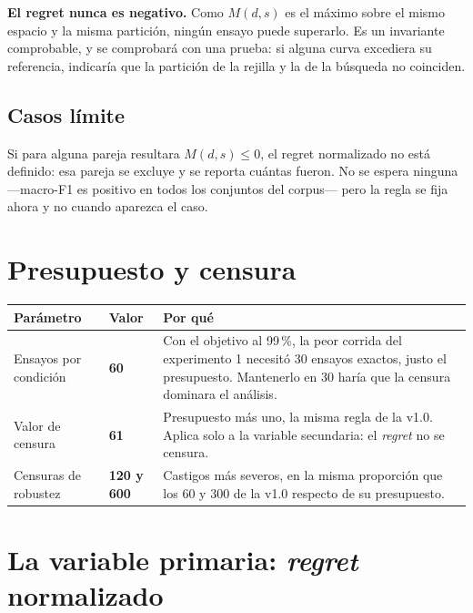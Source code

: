 \documentclass[11pt,letterpaper]{article}
\begin{document}
\textbf{El regret nunca es negativo.} Como $M(d,s)$ es el máximo sobre el mismo
espacio y la misma partición, ningún ensayo puede superarlo. Es un invariante
comprobable, y se comprobará con una prueba: si alguna curva excediera su referencia,
indicaría que la partición de la rejilla y la de la búsqueda no coinciden.

\subsection{Casos límite}

Si para alguna pareja resultara $M(d,s) \leq 0$, el regret normalizado no está
definido: esa pareja se excluye y se reporta cuántas fueron. No se espera ninguna
---macro-F1 es positivo en todos los conjuntos del corpus--- pero la regla se fija
ahora y no cuando aparezca el caso.

\section{Presupuesto y censura}
\label{sec:presupuesto}

\begin{center}
\begin{tabularx}{\textwidth}{L{5.2cm} L{2.6cm} Y}
\toprule
{} \textbf{Parámetro} & \textbf{Valor} & \textbf{Por qué} \\
\midrule
Ensayos por condición & \textbf{60} &
Con el objetivo al 99\,\%, la peor corrida del experimento 1 necesitó 30 ensayos
exactos, justo el presupuesto. Mantenerlo en 30 haría que la censura dominara el
análisis. \\
\midrule
Valor de censura & \textbf{61} &
Presupuesto más uno, la misma regla de la v1.0. Aplica solo a la variable
secundaria: el \emph{regret} no se censura. \\
\midrule
Censuras de robustez & \textbf{120 y 600} &
Castigos más severos, en la misma proporción que los 60 y 300 de la v1.0 respecto de
su presupuesto. \\
\bottomrule
\end{tabularx}
\end{center}

\section{La variable primaria: \textit{regret} normalizado}
\label{sec:variable}
\end{document}
